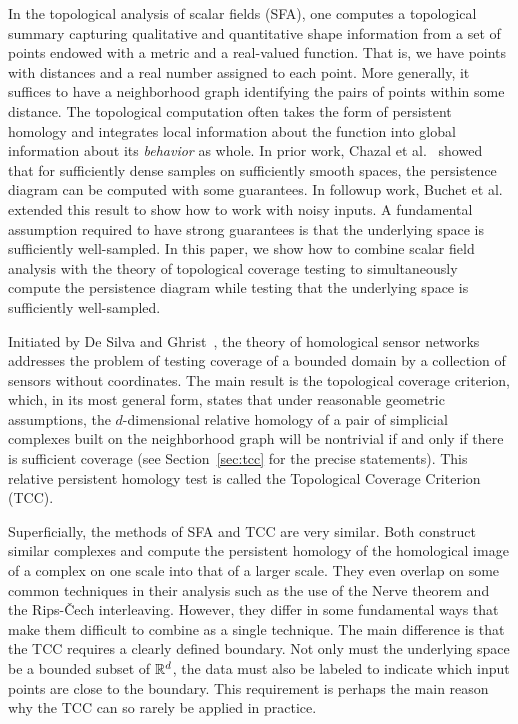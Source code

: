 
In the topological analysis of scalar fields (SFA), one computes a topological summary capturing qualitative and quantitative shape information from a set of points endowed with a metric and a real-valued function.
That is, we have points with distances and a real number assigned to each point.
More generally, it suffices to have a neighborhood graph identifying the pairs of points within some distance.
The topological computation often takes the form of persistent homology and integrates local information about the function into global information about its \emph{behavior} as whole.
In prior work, Chazal et al.~\cite{chazal09analysis} showed that for sufficiently dense samples on sufficiently smooth spaces, the persistence diagram can be computed with some guarantees.
In followup work, Buchet et al.~\cite{buchet15topological} extended this result to show how to work with noisy inputs.
A fundamental assumption required to have strong guarantees is that the underlying space is sufficiently well-sampled.
In this paper, we show how to combine scalar field analysis with the theory of topological coverage testing to simultaneously compute the persistence diagram while testing that the underlying space is sufficiently well-sampled.

Initiated by De Silva and Ghrist~\cite{desilva06coordinate,desilva07coverage,desilva07homological}, the theory of homological sensor networks addresses the problem of testing coverage of a bounded domain by a collection of sensors without coordinates.
The main result is the topological coverage criterion, which, in its most general form, states that under reasonable geometric assumptions, the $d$-dimensional relative homology of a pair of simplicial complexes built on the neighborhood graph will be nontrivial if and only if there is sufficient coverage (see Section~\ref{sec:tcc} for the precise statements).
This relative persistent homology test is called the Topological Coverage Criterion (TCC).

Superficially, the methods of SFA and TCC are very similar.
Both construct similar complexes and compute the persistent homology of the homological image of a complex on one scale into that of a larger scale.
They even overlap on some common techniques in their analysis such as the use of the Nerve theorem and the Rips-\v{C}ech interleaving.
However, they differ in some fundamental ways that make them difficult to combine as a single technique.
The main difference is that the TCC requires a clearly defined boundary.
Not only must the underlying space be a bounded subset of $\mathbb{R}^d$, the data must also be labeled to indicate which input points are close to the boundary.
This requirement is perhaps the main reason why the TCC can so rarely be applied in practice.

